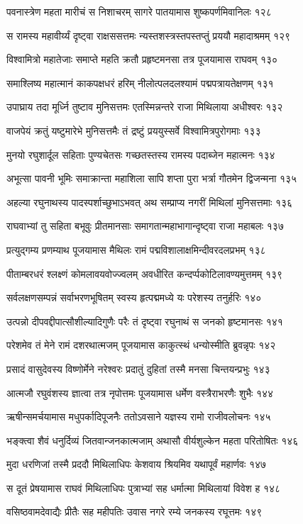 पवनास्त्रेण महता मारीचं स निशाचरम्
सागरे पातयामास शुष्कपर्णमिवानिलः १२८

स रामस्य महावीर्य्यं दृष्ट्वा राक्षससत्तमः
न्यस्तशस्त्रस्तपस्तप्तुं प्रययौ महादाश्रमम् १२९

विश्वामित्रो महातेजाः समाप्ते महति क्रतौ
प्रहृष्टमनसा तत्र पूजयामास राघवम् १३०

समाश्लिष्य महात्मानं काकपक्षधरं हरिम्
नीलोत्पलदलश्यामं पद्मपत्रायतेक्षणम् १३१

उपाघ्राय तदा मूर्ध्नि तुष्टाव मुनिसत्तमः
एतस्मिन्नन्तरे राजा मिथिलाया अधीश्वरः १३२

वाजपेयं क्रतुं यष्टुमारेभे मुनिसत्तमैः
तं द्रष्टुं प्रययुस्सर्वे विश्वामित्रपुरोगमाः १३३

मुनयो रघुशार्दूल सहिताः पुण्यचेतसः
गच्छतस्तस्य रामस्य पदाब्जेन महात्मनः १३४

अभूत्सा पावनी भूमिः समाक्रान्ता महाशिला
सापि शप्ता पुरा भर्त्रा गौतमेन द्विजन्मना १३५

अहल्या रघुनाथस्य पादस्पर्शाच्छुभाऽभवत्
अथ सम्प्राप्य नगरीं मिथिलां मुनिसत्तमाः १३६

राघवाभ्यां तु सहिता बभूवुः प्रीतमानसाः
समागतान्महाभागान्दृष्ट्वा राजा महाबलः १३७

प्रत्युद्गम्य प्रणम्याथ पूजयामास मैथिलः
रामं पद्मविशालाक्षमिन्दीवरदलप्रभम् १३८

पीताम्बरधरं श्लक्ष्णं कोमलावयवोज्ज्वलम्
अवधीरित कन्दर्प्पकोटिलावण्यमुत्तमम् १३९

सर्वलक्षणसम्पन्नं सर्वाभरणभूषितम्
स्वस्य हृत्पद्ममध्ये यः परेशस्य तनुर्हरिः १४०

उत्पन्नो दीपवद्दीपात्सौशील्यादिगुणैः परैः
तं दृष्ट्वा रघुनाथं स जनको हृष्टमानसः १४१

परेशमेव तं मेने रामं दशरथात्मजम्
पूजयामास काकुत्स्थं धन्योस्मीति ब्रुवन्नृपः १४२

प्रसादं वासुदेवस्य विष्णोर्मेने नरेश्वरः
प्रदातुं दुहितां तस्मै मनसा चिन्तयन्प्रभुः १४३

आत्मजौ रघुवंशस्य ज्ञात्वा तत्र नृपोत्तमः
पूजयामास धर्मेण वस्त्रैराभरणैः शुभैः १४४

ऋषीन्समर्चयामास मधुपर्कादिपूजनैः
ततोऽवसाने यज्ञस्य रामो राजीवलोचनः १४५

भङ्क्त्वा शैवं धनुर्दिव्यं जितवान्जनकात्मजाम्
अथासौ वीर्यशुल्केन महता परितोषितः १४६

मुदा धरणिजां तस्मै प्रददौ मिथिलाधिपः
केशवाय श्रियमिव यथापूर्वं महार्णवः १४७

स दूतं प्रेषयामास राघवं मिथिलाधिपः
पुत्राभ्यां सह धर्मात्मा मिथिलायां विवेश ह १४८

वसिष्ठवामदेवाद्यैः प्रीतैः सह महीपतिः
उवास नगरे रम्ये जनकस्य रघूत्तमः १४९


